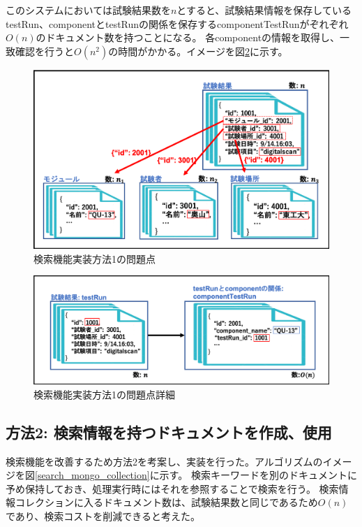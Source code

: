 このシステムにおいては試験結果数を$n$とすると、試験結果情報を保存しているtestRun、componentとtestRunの関係を保存するcomponentTestRunがぞれぞれ$O(n)$のドキュメント数を持つことになる。
各componentの情報を取得し、一致確認を行うと$O(n^2)$の時間がかかる。イメージを図\ref{search_python_testRun}に示す。


\begin{figure}[bpt]
  \begin{center}
    \includegraphics[width=16cm]{search_python_list_problem}
  \caption[検索機能実装方法1の問題点]{検索機能実装方法1の問題点}
  \label{search_python_list_problem}
  \end{center}
\end{figure}

\begin{figure}[bpt]
  \begin{center}
    \includegraphics[width=16cm]{search_python_testRun}
  \caption[検索機能実装方法1の問題点詳細]{検索機能実装方法1の問題点詳細}
  \label{search_python_testRun}
  \end{center}
\end{figure}

\subsection{方法2: 検索情報を持つドキュメントを作成、使用}
検索機能を改善するため方法2を考案し、実装を行った。アルゴリズムのイメージを図\ref{search_mongo_collection}に示す。
検索キーワードを別のドキュメントに予め保持しておき、処理実行時にはそれを参照することで検索を行う。
検索情報コレクションに入るドキュメント数は、試験結果数と同じであるため$O(n)$であり、検索コストを削減できると考えた。

